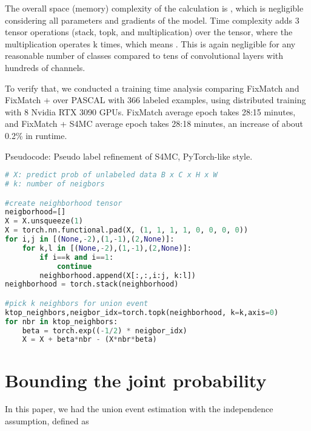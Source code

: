\documentclass{article}
\begin{document}
The overall space (memory) complexity of the calculation is , which is negligible considering all parameters and gradients of the model. Time complexity adds 3 tensor operations (stack, topk, and multiplication) over the  tensor, where the multiplication operates k times, which means . This is again negligible for any reasonable number of classes compared to tens of convolutional layers with hundreds of channels.


To verify that, we conducted a training time analysis comparing FixMatch and FixMatch + \methodname{} over PASCAL with 366 labeled examples, using distributed training with 8 Nvidia RTX 3090 GPUs.
FixMatch average epoch takes 28:15 minutes, and FixMatch + S4MC average epoch takes 28:18 minutes, an increase of about 0.2\% in runtime.





\begin{algorithm}[t]
\caption{\small{Pseudocode: Pseudo label refinement of S4MC, PyTorch-like style.}}
\label{alg:unimatch}
\begin{lstlisting}[language=python]
# X: predict prob of unlabeled data B x C x H x W 
# k: number of neigbors

#create neighborhood tensor 
neigborhood=[]
X = X.unsqueeze(1)
X = torch.nn.functional.pad(X, (1, 1, 1, 1, 0, 0, 0, 0))
for i,j in [(None,-2),(1,-1),(2,None)]:
    for k,l in [(None,-2),(1,-1),(2,None)]:
        if i==k and i==1:
            continue
        neighborhood.append(X[:,:,i:j, k:l])
neighborhood = torch.stack(neighborhood)

#pick k neighbors for union event 
ktop_neighbors,neigbor_idx=torch.topk(neighborhood, k=k,axis=0)
for nbr in ktop_neighbors:
    beta = torch.exp((-1/2) * neigbor_idx)
    X = X + beta*nbr - (X*nbr*beta)

\end{lstlisting}
\end{algorithm}



\section{Bounding the joint probability}\label{sec:joint_bound}
In this paper, we had the union event estimation with the independence assumption, defined as
\end{document}
